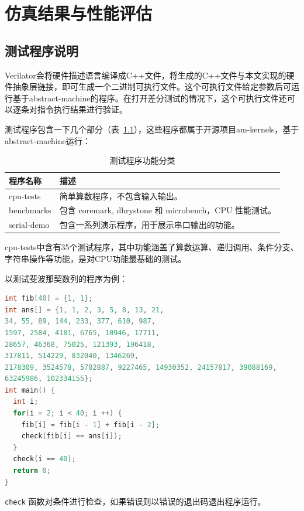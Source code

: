 \chapter{仿真结果与性能评估}

\section{测试程序说明}

Verilator会将硬件描述语言编译成C++文件，将生成的C++文件与本文实现的硬件抽象层链接，即可生成一个二进制可执行文件。这个可执行文件给定参数后可运行基于abstract-machine的程序。在打开差分测试的情况下，这个可执行文件还可以逐条对指令执行结果进行验证。

测试程序包含一下几个部分（表~\ref{tab:program_description}），这些程序都属于开源项目am-kernels，基于abstract-machine运行：

\begin{table}[h]
\centering
\begin{tabular}{|l | p{10cm}|}
\hline
\textbf{程序名称} & \textbf{描述} \\
\hline
cpu-tests & 简单算数程序，不包含输入输出。 \\
\hline
benchmarks & 包含 coremark, dhrystone 和 microbench，CPU 性能测试。 \\
\hline
serial-demo & 包含一系列演示程序，用于展示串口输出的功能。 \\
\hline
\end{tabular}
\caption{测试程序功能分类}
\label{tab:program_description}
\end{table}

cpu-tests中含有35个测试程序，其中功能涵盖了算数运算、递归调用、条件分支、字符串操作等功能，是对CPU功能最基础的测试。

以测试斐波那契数列的程序为例：

\begin{lstlisting}[language=C]
int fib[40] = {1, 1};
int ans[] = {1, 1, 2, 3, 5, 8, 13, 21, 
34, 55, 89, 144, 233, 377, 610, 987, 
1597, 2584, 4181, 6765, 10946, 17711, 
28657, 46368, 75025, 121393, 196418, 
317811, 514229, 832040, 1346269, 
2178309, 3524578, 5702887, 9227465, 14930352, 24157817, 39088169,
63245986, 102334155};
int main() {
  int i;
  for(i = 2; i < 40; i ++) {
    fib[i] = fib[i - 1] + fib[i - 2];
    check(fib[i] == ans[i]);
  }
  check(i == 40);
  return 0;
}
\end{lstlisting}

\lstinline{check} 函数对条件进行检查，如果错误则以错误的退出码退出程序运行。

